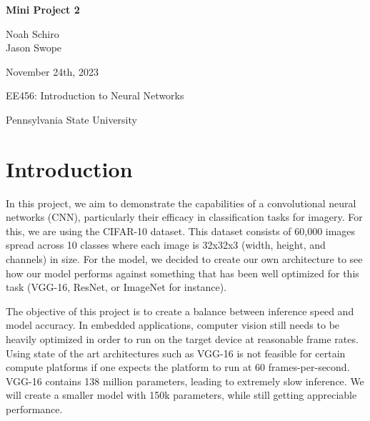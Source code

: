 \documentclass[letterpaper, 12pt]{article}
\begin{document}


\begin{titlepage}
    \begin{center}
        \vspace*{1in}
        \Huge{\textbf{Mini Project 2}}
        
        \vspace{0.5in}
        \Large{Noah Schiro}\\
        \Large{Jason Swope}
        
        \vfill
        
        \normalsize{November 24th, 2023}
        
        \vspace{0.5in}
        
        \normalsize{EE456: Introduction to Neural Networks}
        
        \vspace{0.5in}
        
        \normalsize{Pennsylvania State University}
        
    \end{center}
\end{titlepage}

\newpage

\setlength{\parindent}{5ex}

\section{Introduction}
In this project, we aim to demonstrate the capabilities of a convolutional neural networks (CNN), particularly their efficacy in classification tasks for imagery. For this, we are using the CIFAR-10 dataset. This dataset consists of 60,000 images spread across 10 classes where each image is 32x32x3 (width, height, and channels) in size. For the model, we decided to create our own architecture to see how our model performs against something that has been well optimized for this task (VGG-16, ResNet, or ImageNet for instance).

The objective of this project is to create a balance between inference speed and model accuracy. In embedded applications, computer vision still needs to be heavily optimized in order to run on the target device at reasonable frame rates. Using state of the art architectures such as VGG-16 is not feasible for certain compute platforms if one expects the platform to run at 60 frames-per-second. VGG-16 contains 138 million parameters, leading to extremely slow inference. We will create a smaller model with 150k parameters, while still getting appreciable performance.
\end{document}
